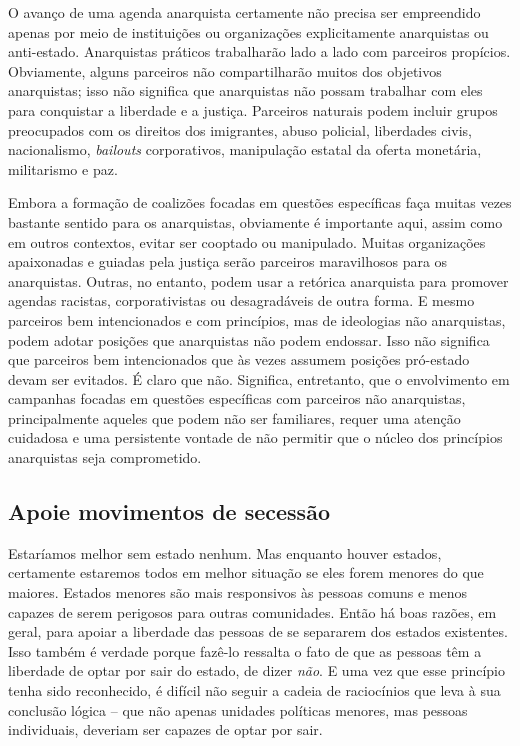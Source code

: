 O avanço de uma agenda anarquista certamente não precisa ser empreendido apenas por meio de instituições ou organizações explicitamente anarquistas ou anti-estado. Anarquistas práticos trabalharão lado a lado com parceiros propícios. Obviamente, alguns parceiros não compartilharão muitos dos objetivos anarquistas; isso não significa que anarquistas não possam trabalhar com eles para conquistar a liberdade e a justiça. Parceiros naturais podem incluir grupos preocupados com os direitos dos imigrantes, abuso policial, liberdades civis, nacionalismo, \emph{bailouts} corporativos, manipulação estatal da oferta monetária, militarismo e paz.

Embora a formação de coalizões focadas em questões específicas faça muitas vezes bastante sentido para os anarquistas, obviamente é importante aqui, assim como em outros contextos, evitar ser cooptado ou manipulado. Muitas organizações apaixonadas e guiadas pela justiça serão parceiros maravilhosos para os anarquistas. Outras, no entanto, podem usar a retórica anarquista para promover agendas racistas, corporativistas ou desagradáveis de outra forma. E mesmo parceiros bem intencionados e com princípios, mas de ideologias não anarquistas, podem adotar posições que anarquistas não podem endossar. Isso não significa que parceiros bem intencionados que às vezes assumem posições pró-estado devam ser evitados. É claro que não. Significa, entretanto, que o envolvimento em campanhas focadas em questões específicas com parceiros não anarquistas, principalmente aqueles que podem não ser familiares, requer uma atenção cuidadosa e uma persistente vontade de não permitir que o núcleo dos princípios anarquistas seja comprometido.

\subsection*{Apoie movimentos de secessão}

Estaríamos melhor sem estado nenhum. Mas enquanto houver estados, certamente estaremos todos em melhor situação se eles forem menores do que maiores. Estados menores são mais responsivos às pessoas comuns e menos capazes de serem perigosos para outras comunidades. Então há boas razões, em geral, para apoiar a liberdade das pessoas de se separarem dos estados existentes. Isso também é verdade porque fazê-lo ressalta o fato de que as pessoas têm a liberdade de optar por sair do estado, de dizer \emph{não}. E uma vez que esse princípio tenha sido reconhecido, é difícil não seguir a cadeia de raciocínios que leva à sua conclusão lógica -- que não apenas unidades políticas menores, mas pessoas individuais, deveriam ser capazes de optar por sair.

